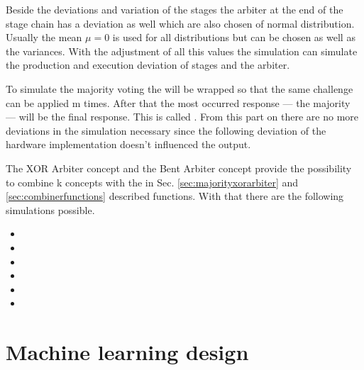Beside the deviations and variation of the stages the arbiter at the end of the stage chain has a deviation as well which are also chosen of normal distribution. 
Usually the mean $ \mu = 0 $ is used for all distributions but can be chosen as well as the variances.
With the adjustment of all this values the simulation can simulate the production and execution deviation of stages and the arbiter.

To simulate the majority voting the \apuf will be wrapped so that the same challenge can be applied m times.
After that the most occurred response --- the majority --- will be the final response.
This is called \mpuf.
From this part on there are no more deviations in the simulation necessary since the following deviation of the hardware implementation doesn't influenced the output.

The \ac{XOR} Arbiter concept and the Bent Arbiter concept provide the possibility to combine k concepts with the in Sec. \ref{sec:majorityxorarbiter} and \ref{sec:combinerfunctions} described functions.
With that there are the following \puf simulations possible.

\begin{itemize}
\item \apuf
\item \xpuf
\item \bpuf
\item \mpuf
\item \mxpuf
\item \mbpuf
\end{itemize}


\fi

\section{Machine learning design}

